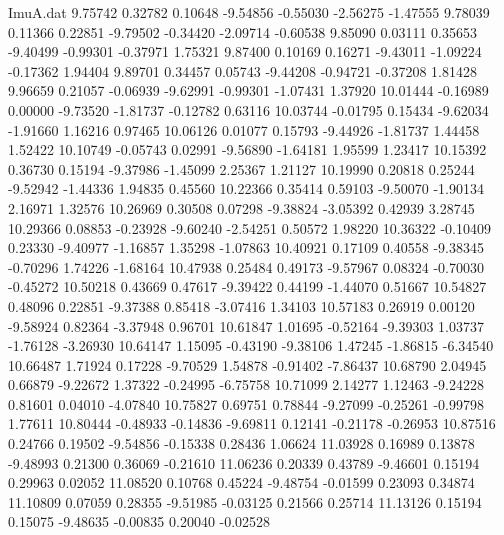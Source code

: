 \begin{filecontents}{ImuA.dat}
   9.75742    0.32782    0.10648   -9.54856   -0.55030   -2.56275   -1.47555
   9.78039    0.11366    0.22851   -9.79502   -0.34420   -2.09714   -0.60538
   9.85090    0.03111    0.35653   -9.40499   -0.99301   -0.37971    1.75321
   9.87400    0.10169    0.16271   -9.43011   -1.09224   -0.17362    1.94404
   9.89701    0.34457    0.05743   -9.44208   -0.94721   -0.37208    1.81428
   9.96659    0.21057   -0.06939   -9.62991   -0.99301   -1.07431    1.37920
  10.01444   -0.16989    0.00000   -9.73520   -1.81737   -0.12782    0.63116
  10.03744   -0.01795    0.15434   -9.62034   -1.91660    1.16216    0.97465
  10.06126    0.01077    0.15793   -9.44926   -1.81737    1.44458    1.52422
  10.10749   -0.05743    0.02991   -9.56890   -1.64181    1.95599    1.23417
  10.15392    0.36730    0.15194   -9.37986   -1.45099    2.25367    1.21127
  10.19990    0.20818    0.25244   -9.52942   -1.44336    1.94835    0.45560
  10.22366    0.35414    0.59103   -9.50070   -1.90134    2.16971    1.32576
  10.26969    0.30508    0.07298   -9.38824   -3.05392    0.42939    3.28745
  10.29366    0.08853   -0.23928   -9.60240   -2.54251    0.50572    1.98220
  10.36322   -0.10409    0.23330   -9.40977   -1.16857    1.35298   -1.07863
  10.40921    0.17109    0.40558   -9.38345   -0.70296    1.74226   -1.68164
  10.47938    0.25484    0.49173   -9.57967    0.08324   -0.70030   -0.45272
  10.50218    0.43669    0.47617   -9.39422    0.44199   -1.44070    0.51667
  10.54827    0.48096    0.22851   -9.37388    0.85418   -3.07416    1.34103
  10.57183    0.26919    0.00120   -9.58924    0.82364   -3.37948    0.96701
  10.61847    1.01695   -0.52164   -9.39303    1.03737   -1.76128   -3.26930
  10.64147    1.15095   -0.43190   -9.38106    1.47245   -1.86815   -6.34540
  10.66487    1.71924    0.17228   -9.70529    1.54878   -0.91402   -7.86437
  10.68790    2.04945    0.66879   -9.22672    1.37322   -0.24995   -6.75758
  10.71099    2.14277    1.12463   -9.24228    0.81601    0.04010   -4.07840
  10.75827    0.69751    0.78844   -9.27099   -0.25261   -0.99798    1.77611
  10.80444   -0.48933   -0.14836   -9.69811    0.12141   -0.21178   -0.26953
  10.87516    0.24766    0.19502   -9.54856   -0.15338    0.28436    1.06624
  11.03928    0.16989    0.13878   -9.48993    0.21300    0.36069   -0.21610
  11.06236    0.20339    0.43789   -9.46601    0.15194    0.29963    0.02052
  11.08520    0.10768    0.45224   -9.48754   -0.01599    0.23093    0.34874
  11.10809    0.07059    0.28355   -9.51985   -0.03125    0.21566    0.25714
  11.13126    0.15194    0.15075   -9.48635   -0.00835    0.20040   -0.02528

\end{filecontents}
